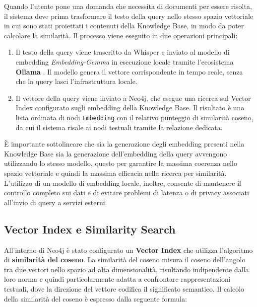 Quando l'utente pone una domanda che necessita di documenti per essere risolta, il sistema deve prima trasformare il testo della query nello stesso spazio vettoriale in cui sono stati proiettati i contenuti della Knowledge Base, in modo da poter calcolare la similarità. Il processo viene eseguito in due operazioni principali:

\begin{enumerate}
    \item Il testo della query viene trascritto da Whisper e inviato al modello di embedding \textit{Embedding-Gemma} \cite{embedding_gemma_2025} in esecuzione locale tramite l'ecosistema \textbf{Ollama} \cite{ollama}. Il modello genera il vettore corrispondente in tempo reale, senza che la query lasci l'infrastruttura locale.

    \item Il vettore della query viene inviato a Neo4j, che esegue una ricerca sul Vector Index configurato sugli embedding della Knowledge Base. Il risultato è una lista ordinata di nodi \texttt{Embedding} con il relativo punteggio di similarità coseno, da cui il sistema risale ai nodi testuali tramite la relazione dedicata.

\end{enumerate}

È importante sottolineare che sia la generazione degli embedding presenti nella Knowledge Base sia la generazione dell'embedding della query avvengono utilizzando lo stesso modello, questo per garantire la massima coerenza nello spazio vettoriale e quindi la massima efficacia nella ricerca per similarità. L'utilizzo di un modello di embedding locale, inoltre, consente di mantenere il controllo completo sui dati e di evitare problemi di latenza o di privacy associati all'invio di query a servizi esterni.

\subsection{Vector Index e Similarity Search}

All'interno di Neo4j è stato configurato un \textbf{Vector Index} \cite{neo4j_vector_search} che utilizza l'algoritmo di \textbf{similarità del coseno}. La similarità del coseno misura il coseno dell'angolo tra due vettori nello spazio ad alta dimensionalità, risultando indipendente dalla loro norma e quindi particolarmente adatta a confrontare rappresentazioni testuali, dove la direzione del vettore codifica il significato semantico. Il calcolo della similarità del coseno è espresso dalla seguente formula:

